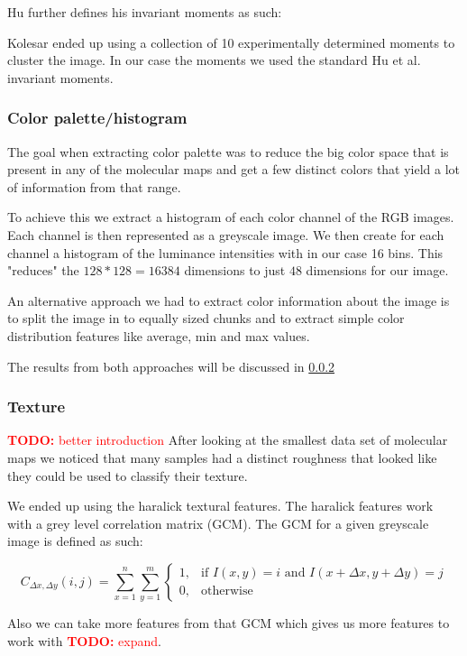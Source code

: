 \documentclass[journal]{vgtc}       %
\newcommand{\todo}[1]{\textcolor{red}{\textbf{TODO:} #1}}
\begin{document}
Hu further defines his invariant moments as such:




Kolesar ended up using a collection of 10 experimentally determined moments to cluster the image. In our case the moments we used the standard Hu et al. invariant moments. 

\subsubsection{Color palette/histogram }

The goal when extracting color palette was to reduce the big color space that is present in any of the molecular maps and get a few distinct  colors that yield a lot of information from that range.

To achieve this we extract a histogram of each color channel of the RGB images. Each channel is then represented as a greyscale image. We then create for each channel a histogram of the luminance intensities with in our case 16 bins. This "reduces" the \(128*128 = 16384\) dimensions to just \(48\) dimensions for our image.

An alternative approach we had to extract color information about the image is to split the image in to equally sized chunks and to extract simple color distribution features like average, min and max values.

The results from both approaches will be discussed in \ref{}

\subsubsection{Texture}
\todo{better introduction}
After looking at the smallest data set of molecular maps we noticed that many samples had a distinct roughness that looked like they could be used to classify their texture.

We ended up using the haralick textural features. The haralick features work with a grey level correlation matrix (GCM). The GCM for a given greyscale image is defined as such:

\[{\displaystyle C_{\Delta x,\Delta y}(i,j)=\sum _{x=1}^{n}\sum _{y=1}^{m}{\begin{cases}1,&{\text{if }}I(x,y)=i{\text{ and }}I(x+\Delta x,y+\Delta y)=j\\0,&{\text{otherwise}}\end{cases}}}\]

Also we can take more features from that GCM which gives us more features to work with \todo{expand}.
\end{document}
